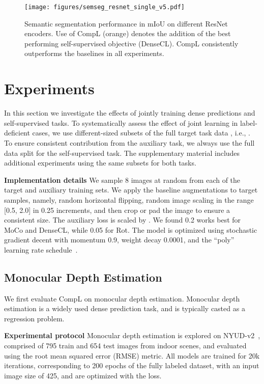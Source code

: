 \documentclass[10pt,twocolumn,letterpaper]{article}
\newcommand{\parsection}[1]{\vspace{1mm}\noindent\textbf{#1 }}
\begin{document}
\begin{figure*}[ht]
\small
 \centering
    \texttt{[image: figures/semseg\_resnet\_single\_v5.pdf]}
\caption{Semantic segmentation performance in mIoU on different ResNet encoders. Use of CompL (orange) denotes the addition of the best performing self-supervised objective (DenseCL). CompL consistently outperforms the baselines in all experiments.}
\label{fig:semseg_encoders}
\vspace{-0.2in}
\end{figure*}


\section{Experiments}
\label{sec:exp}

In this section we investigate the effects of jointly training dense predictions and self-supervised tasks. 
To systematically assess the effect of joint learning in label-deficient cases, we use different-sized subsets  of the full target task data , i.e., . 
To ensure consistent contribution from the auxiliary task, we always use the full data split  for the self-supervised task. 
The supplementary material includes additional experiments using the same subsets for both tasks.

\parsection{Implementation details}
We sample 8 images at random from each of the target and auxiliary training sets. 
We apply the baseline augmentations to target samples, namely, random horizontal flipping, random image scaling in the range [0.5, 2.0] in 0.25 increments, and then crop or pad the image to ensure a consistent size. 
The auxiliary loss is scaled by .
We found 0.2 works best for MoCo and DenseCL, while 0.05 for Rot.
The model is optimized using stochastic gradient decent with momentum 0.9, weight decay 0.0001, and the ``poly'' learning rate schedule~\cite{chen2017deeplab}. 




\subsection{Monocular Depth Estimation}
\label{sec:mde}
We first evaluate CompL on monocular depth estimation. 
Monocular depth estimation is a widely used dense prediction task, and is typically casted as a regression problem.

\parsection{Experimental protocol}
Monocular depth estimation is explored on NYUD-v2~\cite{silberman2012indoor}, comprised of 795 train and 654 test images from indoor scenes, and evaluated using the root mean squared error (RMSE) metric. 
All models are trained for 20k iterations, corresponding to 200 epochs of the fully labeled dataset, with an input image size of 425, and are optimized with the  loss. 
\end{document}

